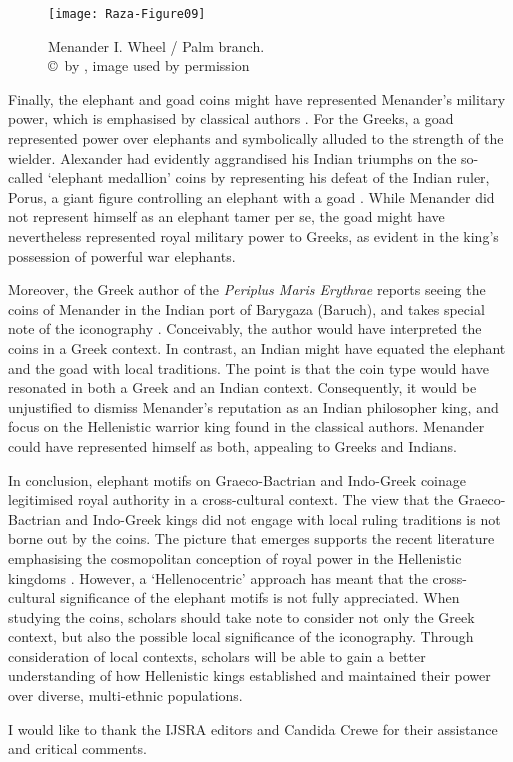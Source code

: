 \documentclass{ijsra}
\begin{document}
\begin{figure}[!htb] %
	\centering
	\texttt{[image: Raza-Figure09]}
	\caption{Menander I. Wheel / Palm branch.
		{\normalfont\scriptsize \\ \copyright\ by \cite{Coin}, image used by permission}}
	\label{fig:Raza-Figure09}
\end{figure}

Finally, the elephant and goad coins might have represented Menander’s military power, which is emphasised by classical authors \parencite[644]{Mairs2015}.
For the Greeks, a goad represented power over elephants and symbolically alluded to the strength of the wielder.
Alexander had evidently aggrandised his Indian triumphs on the so-called ‘elephant medallion’ coins by representing his defeat of the Indian ruler, Porus, a giant figure controlling an elephant with a goad \parencites[151--152]{Holt2003}[204--205]{Stewart1991}.
While Menander did not represent himself as an elephant tamer per se, the goad might have nevertheless represented royal military power to Greeks, as evident in the king’s possession of powerful war elephants. 

Moreover, the Greek author of the \emph{Periplus Maris Erythrae} reports seeing the coins of Menander in the Indian port of Barygaza (Baruch), and takes special note of the iconography .
Conceivably, the author would have interpreted the coins in a Greek context. In contrast, an Indian might have equated the elephant and the goad with local traditions.
The point is that the coin type would have resonated in both a Greek and an Indian context.
Consequently, it would be unjustified to dismiss Menander’s reputation as an Indian philosopher king, and focus on the Hellenistic warrior king found in the classical authors.
Menander could have represented himself as both, appealing to Greeks and Indians.

In conclusion, elephant motifs on Graeco-Bactrian and Indo-Greek coinage legitimised royal authority in a cross-cultural context.
The view that the Graeco-Bactrian and Indo-Greek kings did not engage with local ruling traditions is not borne out by the coins.
The picture that emerges supports the recent literature emphasising the cosmopolitan conception of royal power in the Hellenistic kingdoms \parencite[11]{Strootman2014}.
However, a ‘Hellenocentric’ approach has meant that the cross-cultural significance of the elephant motifs is not fully appreciated.
When studying the coins, scholars should take note to consider not only the Greek context, but also the possible local significance of the iconography.
Through consideration of local contexts, scholars will be able to gain a better understanding of how Hellenistic kings established and maintained their power over diverse, multi-ethnic populations.

\IJSRAseparator
I  would like to thank the IJSRA editors and Candida Crewe for their assistance and critical comments.
\IJSRAclosing%
\end{document}
